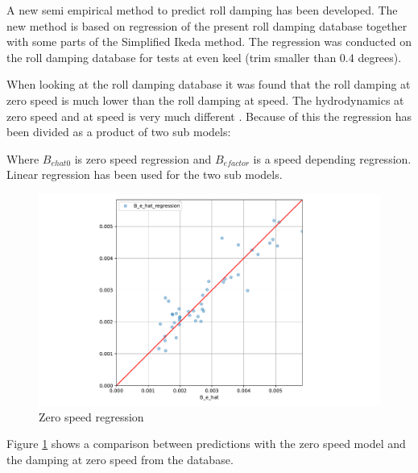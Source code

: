 A new semi empirical method to predict roll damping has been developed. The new method is based on regression of the present roll damping database together with some parts of the Simplified Ikeda method.  The regression was conducted on the roll damping database for tests at even keel (trim smaller than 0.4 degrees).

When looking at the roll damping database it was found that the roll damping at zero speed is much lower than the roll damping at speed. The hydrodynamics at zero speed and at speed is very much different \parencite{ikeda_velocity_1979}. Because of this the regression has been divided as a product of two sub models:

Where $B_{ehat0}$ is zero speed regression and $B_{efactor}$ is a speed depending regression. Linear regression has been used for the two sub models. 

\begin{figure}[H]
    \centering
    \includegraphics[width=\columnwidth]{figures/B_e_hat0_regression.pdf}
    \caption{Zero speed regression}
    \label{fig:B_e_hat0_regression}
\end{figure}
Figure \ref{fig:B_e_hat0_regression} shows a comparison between predictions with the zero speed model and the damping at zero speed from the database.

